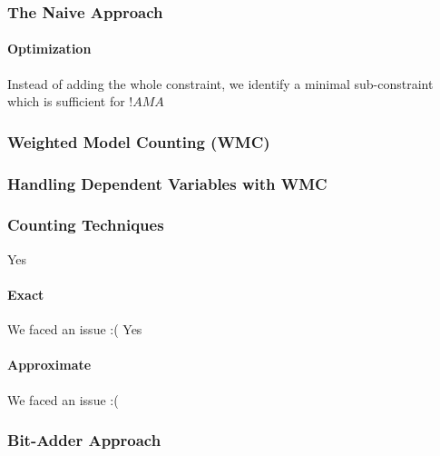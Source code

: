 \documentclass{beamer}
\begin{document}
\begin{frame}
\frametitle{The Naive Approach}
\framesubtitle{Optimization}
Instead of adding the whole constraint, we identify a minimal sub-constraint which is sufficient for ${!AMA}$
\end{frame}

\begin{frame}
\frametitle{Weighted Model Counting (WMC)}
\end{frame}

\begin{frame}
\frametitle{Handling Dependent Variables with WMC}
\end{frame}

\begin{frame}
\frametitle{Counting Techniques}
Yes
\pause
\framesubtitle{Exact}
We faced an issue :(
Yes
\pause
\framesubtitle{Approximate}
We faced an issue :(
\end{frame}

\begin{frame}
\frametitle{Bit-Adder Approach}
\end{frame}
\end{document}
